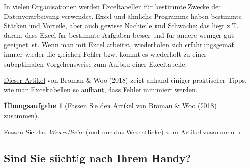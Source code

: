 \documentclass[
  letterpaper,
  twoside,
  open=any]{scrbook}
\theoremstyle{definition}
\theoremstyle{definition}
\newtheorem{exercise}{Übungsaufgabe}[chapter]
\theoremstyle{definition}
\theoremstyle{remark}
\begin{document}
In vielen Organisationen werden Exceltabellen für bestimmte Zwecke der
Datenverarbeitung verwendet. Excel und ähnliche Programme haben
bestimmte Stärken und Vorteile, aber auch gewisse Nachteile und
Schwäche; das liegt z.T. daran, dass Excel für bestimmte Aufgaben besser
und für andere weniger gut geeignet ist. Wenn man mit Excel arbeitet,
wiederholen sich erfahrungsgemäß immer wieder die gleichen Fehler bzw.
kommt es wiederholt zu einer suboptimalen Vorgehensweise zum Aufbau
einer Exceltabelle.

\href{https://www.tandfonline.com/doi/full/10.1080/00031305.2017.1375989}{Dieser
Artikel} von Broman \& Woo (2018) zeigt anhand einiger praktischer
Tipps, wie man Exceltabellen so aufbaut, dass Fehler minimiert werden.

\begin{exercise}[Fassen Sie den Artikel von Broman \& Woo (2018)
zusammen]\protect\hypertarget{exr-xls-paper}{}\label{exr-xls-paper}

Fassen Sie das \emph{Wesentliche} (und nur das Wesentliche) zum Artikel
zusammen. \(\square\)

\end{exercise}

\subsection{Sind Sie süchtig nach Ihrem
Handy?}\label{sind-sie-suxfcchtig-nach-ihrem-handy}
\end{document}
